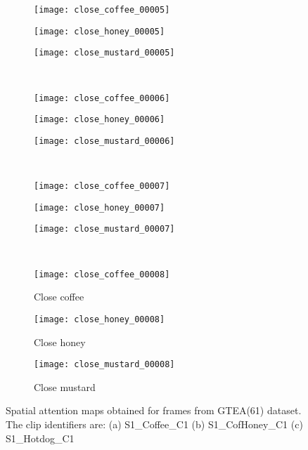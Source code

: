 \documentclass{bmvc2k}
\begin{document}
\begin{figure}[h]
\begin{subfigure}[b]{0.32\textwidth}
		\texttt{[image: close\_coffee\_00005]}
	\end{subfigure}
	\begin{subfigure}[b]{0.32\textwidth}
		\texttt{[image: close\_honey\_00005]}
	\end{subfigure}
	\begin{subfigure}[b]{0.32\textwidth}
		\texttt{[image: close\_mustard\_00005]}
	\end{subfigure}\\
	\vskip 2mm
	\begin{subfigure}[b]{0.32\textwidth}
		\texttt{[image: close\_coffee\_00006]}
	\end{subfigure}
	\begin{subfigure}[b]{0.32\textwidth}
		\texttt{[image: close\_honey\_00006]}
	\end{subfigure}
	\begin{subfigure}[b]{0.32\textwidth}
		\texttt{[image: close\_mustard\_00006]}
	\end{subfigure}\\
	\vskip 2mm
	\begin{subfigure}[b]{0.32\textwidth}
		\texttt{[image: close\_coffee\_00007]}
	\end{subfigure}
	\begin{subfigure}[b]{0.32\textwidth}
		\texttt{[image: close\_honey\_00007]}
	\end{subfigure}
	\begin{subfigure}[b]{0.32\textwidth}
		\texttt{[image: close\_mustard\_00007]}
	\end{subfigure}\\
	\vskip 2mm
	\begin{subfigure}[b]{0.32\textwidth}
		\texttt{[image: close\_coffee\_00008]}
		\caption{Close coffee}
	\end{subfigure}
	\begin{subfigure}[b]{0.32\textwidth}
		\texttt{[image: close\_honey\_00008]}
		\caption{Close honey}
	\end{subfigure}
	\begin{subfigure}[b]{0.32\textwidth}
		\texttt{[image: close\_mustard\_00008]}
		\caption{Close mustard}
	\end{subfigure}
	\vspace*{2mm}
	\caption{Spatial attention maps obtained for frames from GTEA(61) dataset. The clip identifiers are: (a) S1\_Coffee\_C1 (b) S1\_CofHoney\_C1 (c) S1\_Hotdog\_C1}
	\label{fig:fig_ex1}
\end{figure}
\end{document}
